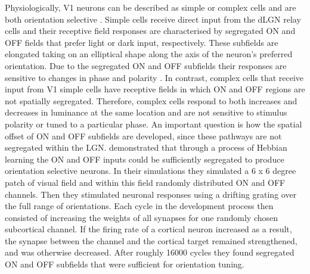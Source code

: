 \documentclass[12pt]{article}
\begin{document}
Physiologically, V1 neurons can be described as simple or complex cells and are both orientation selective \autocite{skottunClassifyingSimpleComplex1991}. Simple cells receive direct input from the dLGN relay cells and their receptive field responses are characterised by segregated ON and OFF fields that prefer light or dark input, respectively. These subfields are elongated taking on an elliptical shape along the axis of the neuron's preferred orientation. Due to the segregated ON and OFF subfields their responses are sensitive to changes in phase and polarity \autocite{mechlerClassificationSimpleComplex2002}. In contrast, complex cells that receive input from V1 simple cells have receptive fields in which ON and OFF regions are not spatially segregated. Therefore, complex cells respond to both increases and decreases in luminance at the same location and are not sensitive to stimulus polarity or tuned to a particular phase. An important question is how the spatial offset of ON and OFF subfields are developed, since these pathways are not segregated within the LGN. \textcite{nguyenModelOriginDevelopment2019} demonstrated that through a process of Hebbian learning the ON and OFF inputs could be sufficiently segregated to produce orientation selective neurons. In their simulations they simulated a 6 x 6 degree patch of visual field and within this field randomly distributed ON and OFF channels. Then they stimulated neuronal responses using a drifting grating over the full range of orientations. Each cycle in the development process then consisted of increasing the weights of all synapses for one randomly chosen subcortical channel. If the firing rate of a cortical neuron increased as a result, the synapse between the channel and the cortical target remained strengthened, and was otherwise decreased. After roughly 16000 cycles they found segregated ON and OFF subfields that were sufficient for orientation tuning.
\bigbreak
\end{document}
